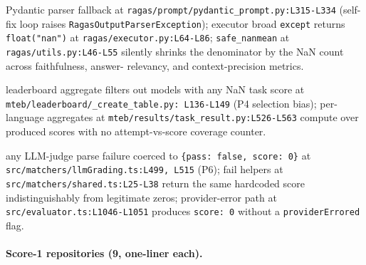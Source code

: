 \documentclass{article}
\begin{document}
\begin{description}[leftmargin=0pt,itemindent=0pt,labelindent=0pt,labelsep=0.4em,itemsep=2pt,topsep=2pt,parsep=0pt,font=\normalfont\bfseries]
\item[ragas:] Pydantic parser fallback at
\texttt{ragas/prompt/pydantic\_prompt.py:L315-L334} (self-fix
loop raises \texttt{RagasOutputParserException}); executor
broad \texttt{except} returns \texttt{float("nan")} at
\texttt{ragas/executor.py:L64-L86}; \texttt{safe\_nanmean} at
\texttt{ragas/utils.py:L46-L55} silently shrinks the
denominator by the NaN count across faithfulness, answer-%
relevancy, and context-precision metrics.

\item[MTEB:] leaderboard aggregate filters out models with any
NaN task score at \texttt{mteb/leaderboard/\_create\_table.py:%
L136-L149} (P4 selection bias); per-language aggregates at
\texttt{mteb/results/task\_result.py:L526-L563} compute over
produced scores with no attempt-vs-score coverage counter.

\item[promptfoo (TypeScript):] any LLM-judge parse failure
coerced to \texttt{\{pass: false, score: 0\}} at
\texttt{src/matchers/llmGrading.ts:L499, L515} (P6); fail
helpers at \texttt{src/matchers/shared.ts:L25-L38} return the
same hardcoded score indistinguishably from legitimate zeros;
provider-error path at \texttt{src/evaluator.ts:L1046-L1051}
produces \texttt{score: 0} without a \texttt{providerErrored}
flag.
\end{description}

\paragraph{Score-1 repositories (9, one-liner each).}
\end{document}
